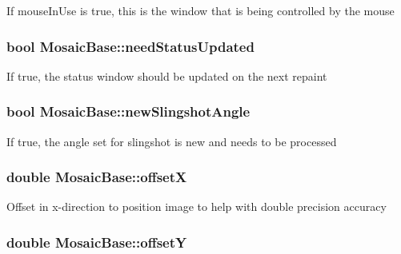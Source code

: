 \label{class_mosaic_base_a9f29d02425823a27e125921b013d6999}
If mouseInUse is true, this is the window that is being controlled by the mouse \hypertarget{class_mosaic_base_a8548f7a8fd7373fb4833edf8bdc30292}{
\subsubsection[{needStatusUpdated}]{\setlength{\rightskip}{0pt plus 5cm}bool {\bf MosaicBase::needStatusUpdated}}}
\label{class_mosaic_base_a8548f7a8fd7373fb4833edf8bdc30292}
If true, the status window should be updated on the next repaint \hypertarget{class_mosaic_base_a996c3daa013813dc46cd9b0e5a86c97b}{
\subsubsection[{newSlingshotAngle}]{\setlength{\rightskip}{0pt plus 5cm}bool {\bf MosaicBase::newSlingshotAngle}}}
\label{class_mosaic_base_a996c3daa013813dc46cd9b0e5a86c97b}
If true, the angle set for slingshot is new and needs to be processed \hypertarget{class_mosaic_base_a743ebc8ce0afa0e9dbe869cad1b258bc}{
\subsubsection[{offsetX}]{\setlength{\rightskip}{0pt plus 5cm}double {\bf MosaicBase::offsetX}}}
\label{class_mosaic_base_a743ebc8ce0afa0e9dbe869cad1b258bc}
Offset in x-\/direction to position image to help with double precision accuracy \hypertarget{class_mosaic_base_a7f85154572a64ea2b945d9582a002720}{
\subsubsection[{offsetY}]{\setlength{\rightskip}{0pt plus 5cm}double {\bf MosaicBase::offsetY}}}

